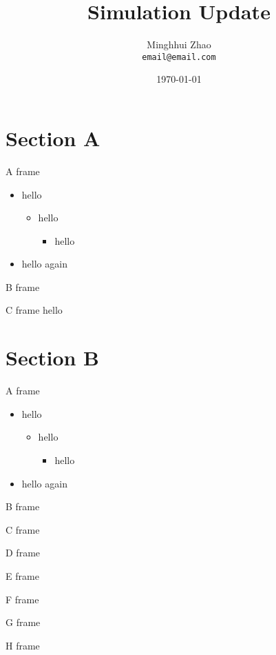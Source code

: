 \documentclass[aspectratio=43]{beamer}
\title{Simulation Update}
\institute{ISU \& BNL}
\date[]{\today}
\author[M.H Zhao]{Minghhui Zhao\\\texttt{email@email.com}}
\begin{document}
\begin{frame}
\titlepage
\end{frame}

\section{Section A}
\begin{frame}{A frame}
\begin{itemize}
\item hello
\begin{itemize}
\item hello
\begin{itemize}
\item hello
\end{itemize}
\end{itemize}
\item hello again
\end{itemize}
\end{frame}
\begin{frame}{B frame}
\end{frame}
\begin{frame}{C frame}
  hello
\end{frame}

\section{Section B}
\begin{frame}{A frame}
\begin{itemize}
\item hello
\begin{itemize}
\item hello
\begin{itemize}
\item hello
\end{itemize}
\end{itemize}
\item hello again
\end{itemize}
\end{frame}
\begin{frame}{B frame}
\end{frame}
\begin{frame}{C frame}
\end{frame}
\begin{frame}{D frame}
\end{frame}
\begin{frame}{E frame}
\end{frame}
\begin{frame}{F frame}
\end{frame}
\begin{frame}{G frame}
\end{frame}
\begin{frame}{H frame}
\end{frame}
\end{document}
